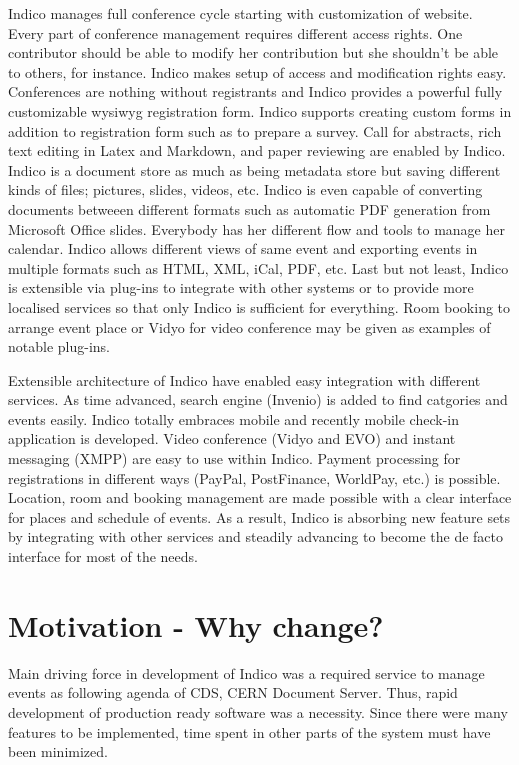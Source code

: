 \par Indico manages full conference cycle starting with customization of website. Every part of conference management requires different access rights. One contributor should be able to modify her contribution but she shouldn't be able to others, for instance. Indico makes setup of access and modification rights easy. Conferences are nothing without registrants and Indico provides a powerful fully customizable wysiwyg registration form. Indico supports creating custom forms in addition to registration form such as to prepare a survey. Call for abstracts, rich text editing in Latex and Markdown, and paper reviewing are enabled by Indico. Indico is a document store as much as being metadata store but saving different kinds of files; pictures, slides, videos, etc. Indico is even capable of converting documents betweeen different formats such as automatic PDF generation from Microsoft Office slides. Everybody has her different flow and tools to manage her calendar. Indico allows different views of same event and exporting events in multiple formats such as HTML, XML, iCal, PDF, etc. Last but not least, Indico is extensible via plug-ins to integrate with other systems or to provide more localised services so that only Indico is sufficient for everything. Room booking to arrange event place or Vidyo for video conference may be given as examples of notable plug-ins.

\par Extensible architecture of Indico have enabled easy integration with different services. As time advanced, search engine (Invenio) is added to find catgories and events easily. Indico totally embraces mobile and recently mobile check-in application is developed. Video conference (Vidyo and EVO) and instant messaging (XMPP) are easy to use within Indico. Payment processing for registrations in different ways (PayPal, PostFinance, WorldPay, etc.) is possible. Location, room and booking management are made possible with a clear interface for places and schedule of events. As a result, Indico is absorbing new feature sets by integrating with other services and steadily advancing to become the de facto interface for most of the needs.

\section{Motivation - Why change?}

\par Main driving force in development of Indico was a required service to manage events as following agenda of CDS, CERN Document Server. Thus, rapid development of production ready software was a necessity. Since there were many features to be implemented, time spent in other parts of the system must have been minimized.

